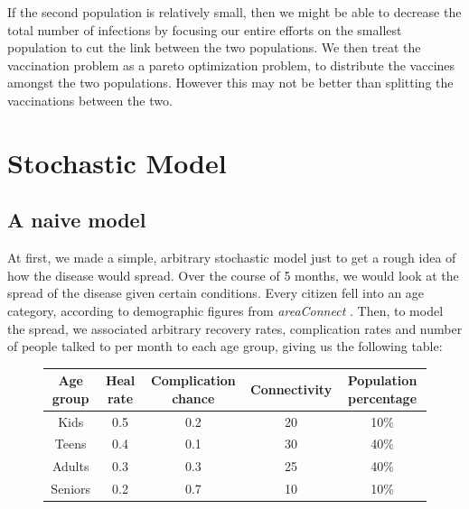 \documentclass{article}
\begin{document}
If the second population is relatively small, then we might be able to 
	decrease the total number of infections by focusing our entire efforts
	on the smallest population to cut the link between the two populations.
We then treat the vaccination problem as a pareto optimization problem, to distribute
	the vaccines amongst the two populations.
However this may not be better than splitting the vaccinations between the two.

\section{Stochastic Model}
\subsection{A naive model}
\par At first, we made a simple, arbitrary stochastic model just to get a rough idea of how the disease would spread. Over the course of 5 months, we would look at the spread of the disease given certain conditions. Every citizen fell into an age category, according to demographic figures from \emph{areaConnect} \cite{areconnect}. Then, to model the spread, we associated arbitrary recovery rates, complication rates and number of people talked to per month to each age group, giving us the following table:
\begin{figure}[H]
\centering
\begin{tabular}{c|c|c|c|c}
Age group & Heal rate & Complication chance & Connectivity & Population percentage\\ \hline
Kids & 0.5 & 0.2 & 20 & 10\%\\
Teens & 0.4 & 0.1 & 30 & 40\%\\
Adults & 0.3 & 0.3 & 25 & 40\%\\
Seniors & 0.2 & 0.7 & 10 & 10\%
\end{tabular}
\end{figure}
\end{document}

